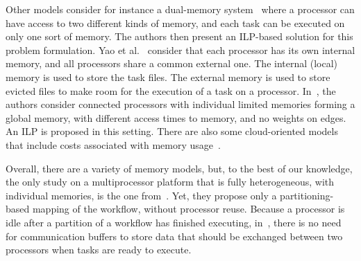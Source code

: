 \documentclass[conference]{IEEEtran}
\newcommand{\new}[1]{{\color{blue}#1}}
\begin{document}
Other models consider for instance a 
dual-memory system~\cite{herrmann2014memory} where a processor can have access 
to two different kinds of memory, and each task can be executed on only one sort of memory.
The authors then present an ILP-based solution for this problem formulation.
%
Yao et al.~\cite{yao2022memory} consider that each processor has its own internal memory, and all
processors share a common external one. The internal (local) memory is used to store the task files.
The external memory is used to store evicted files to make room for the execution of a task on a processor.
%
In~\cite{ding2024ils}, the authors consider connected processors with individual limited memories
forming a global memory, with different access times to memory, and no weights on edges. An ILP
is proposed in this setting. 
%
%
There are also some cloud-oriented models that include costs associated with memory usage~\cite{liang2020memory}.

Overall, there are a variety of memory models, but, to the best of our knowledge, the only study on a multiprocessor
platform that is fully heterogeneous, with individual memories, is the one from~\cite{DBLP:conf/icpp/KulaginaMB24}.
Yet, they propose only a partitioning-based mapping of the workflow, without processor reuse.
\new{Because a processor is idle after a partition of a workflow has finished executing}, in~\cite{DBLP:conf/icpp/KulaginaMB24},
there is no need for communication buffers to store data
that should be \new{exchanged} between two processors when tasks are ready to execute.
\end{document}
